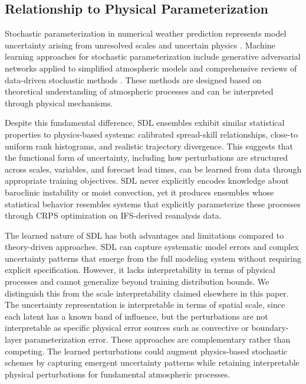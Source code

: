 \documentclass{agujournal2019}
\begin{document}

\subsection{Relationship to Physical Parameterization}

Stochastic parameterization in numerical weather prediction represents model uncertainty arising from unresolved scales and uncertain physics \cite{berner2017stochastic, palmer2009stochastic, palmer2019stochastic}. Machine learning approaches for stochastic parameterization include generative adversarial networks applied to simplified atmospheric models \cite{gagne2020machine} and comprehensive reviews of data-driven stochastic methods \cite{christensen2024machine}. These methods are designed based on theoretical understanding of atmospheric processes and can be interpreted through physical mechanisms. 

Despite this fundamental difference, SDL ensembles exhibit similar statistical properties to physics-based systems: calibrated spread-skill relationships, close-to uniform rank histograms, and realistic trajectory divergence. This suggests that the functional form of uncertainty, including how perturbations are structured across scales, variables, and forecast lead times, can be learned from data through appropriate training objectives. SDL never explicitly encodes knowledge about baroclinic instability or moist convection, yet it produces ensembles whose statistical behavior resembles systems that explicitly parameterize these processes through CRPS optimization on IFS-derived reanalysis data.

The learned nature of SDL has both advantages and limitations compared to theory-driven approaches. SDL can capture systematic model errors and complex uncertainty patterns that emerge from the full modeling system without requiring explicit specification. However, it lacks interpretability in terms of physical processes and cannot generalize beyond training distribution bounds. We distinguish this from the scale interpretability claimed elsewhere in this paper. The uncertainty representation is interpretable in terms of spatial scale, since each latent has a known band of influence, but the perturbations are not interpretable as specific physical error sources such as convective or boundary-layer parameterization error. These approaches are complementary rather than competing. The learned perturbations could augment physics-based stochastic schemes by capturing emergent uncertainty patterns while retaining interpretable physical perturbations for fundamental atmospheric processes.
\end{document}
